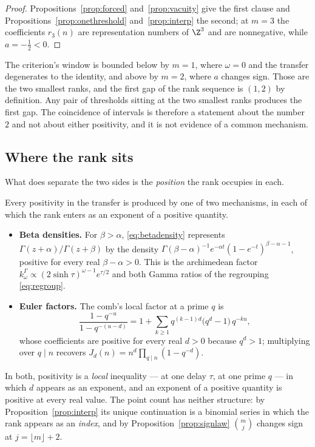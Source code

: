 \begin{proof}
Propositions~\ref{prop:forced} and~\ref{prop:vacuity} give the first clause and
Propositions~\ref{prop:onethreshold} and~\ref{prop:interp} the second; at $m=3$
the coefficients $r_3(n)$ are representation numbers of $\Z^{3}$ and are
nonnegative, while $a=-\frac12<0$.
\end{proof}

\begin{remark}\label{rem:forcedagreement}
The criterion's window is bounded below by $m=1$, where $\omega=0$ and the
transfer degenerates to the identity, and above by $m=2$, where $a$ changes sign.
Those are the two smallest ranks, and the first gap of the rank sequence is
$(1,2)$ by definition. Any pair of thresholds sitting at the two smallest ranks
produces the first gap. The coincidence of intervals is therefore a statement
about the number $2$ and not about either positivity, and it is not evidence of
a common mechanism.
\end{remark}

\subsection{Where the rank sits}\label{sec:whererank}

What does separate the two sides is the \emph{position} the rank occupies in each.

\begin{proposition}\label{prop:position}
Every positivity in the transfer is produced by one of two mechanisms, in each of
which the rank enters as an exponent of a positive quantity.
\begin{itemize}
\item \textbf{Beta densities.} For $\beta>\alpha$, \eqref{eq:betadensity}
 represents $\Gamma(z+\alpha)/\Gamma(z+\beta)$ by the density
 $\Gamma(\beta-\alpha)^{-1}e^{-\alpha t}(1-e^{-t})^{\beta-\alpha-1}$, positive
 for every real $\beta-\alpha>0$. This is the archimedean factor
 $k^\Gamma_\omega\propto(2\sinh\tau)^{\omega-1}e^{\tau/2}$ and both Gamma ratios
 of the regrouping \eqref{eq:regroup}.
\item \textbf{Euler factors.} The comb's local factor at a prime $q$ is
 \begin{equation}\label{eq:eulerlocal}
  \frac{1-q^{-u}}{1-q^{-(u-d)}}
  =1+\sum_{k\ge1}q^{(k-1)d}\big(q^{d}-1\big)\,q^{-ku},
 \end{equation}
 whose coefficients are positive for every real $d>0$ because $q^{d}>1$;
 multiplying over $q\mid n$ recovers $J_d(n)=n^{d}\prod_{q\mid n}(1-q^{-d})$.
\end{itemize}
In both, positivity is a \emph{local} inequality --- at one delay $\tau$, at one
prime $q$ --- in which $d$ appears as an exponent, and an exponent of a positive
quantity is positive at every real value. The point count has neither structure:
by Proposition~\ref{prop:interp} its unique continuation is a binomial series in
which the rank appears as an \emph{index}, and by
Proposition~\ref{prop:signlaw} $\binom mj$ changes sign at $j=\lfloor m\rfloor+2$.
\end{proposition}

